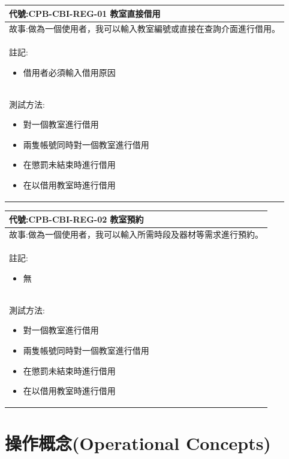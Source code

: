 \documentclass{article}
\begin{document}
\begin{table}
    \begin{tabular}{| m{13cm} |}
		\hline
	代號:CPB-CBI-REG-01	教室直接借用	\\ \hline
	故事:做為一個使用者，我可以輸入教室編號或直接在查詢介面進行借用。		\\	\hline
	註記:
	\begin{itemize}
		\item 借用者必須輸入借用原因
	\end{itemize}		\\ \hline
	測試方法:	
	\begin{itemize}
		\item 對一個教室進行借用
		\item 兩隻帳號同時對一個教室進行借用
		\item 在懲罰未結束時進行借用
		\item 在以借用教室時進行借用
	\end{itemize}
	\\	\hline
    \end{tabular}
\end{table}

\begin{table}
    \begin{tabular}{| m{13cm} |}
		\hline
	代號:CPB-CBI-REG-02	教室預約	\\ \hline
	故事:做為一個使用者，我可以輸入所需時段及器材等需求進行預約。		\\	\hline
	註記:
	\begin{itemize}
		\item 無
	\end{itemize}		\\ \hline
	測試方法:	
	\begin{itemize}
		\item 對一個教室進行借用
		\item 兩隻帳號同時對一個教室進行借用
		\item 在懲罰未結束時進行借用
		\item 在以借用教室時進行借用
	\end{itemize}
	\\	\hline
    \end{tabular}
\end{table}

\newpage

\section[操作概念(OPERATIONAL CONCEPTS)]{操作概念(Operational Concepts)}
\end{document}
